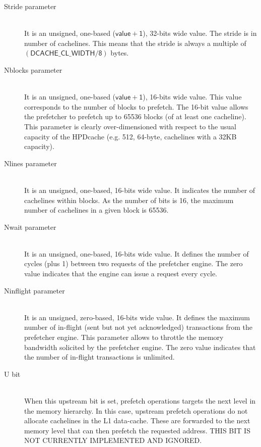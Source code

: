 \documentclass[10pt,titlepage,twoside]{book}
\begin{document}
\begin{description}

\item [\textsf{Stride} parameter] \mbox{}\\
It is an unsigned, one-based ($\mathsf{value + 1}$), 32-bits wide value.
The stride is in number of cachelines.
This means that the stride is always a multiple of $\mathsf{(DCACHE\_CL\_WIDTH/8)}$ bytes.

\item [\textsf{Nblocks} parameter] \mbox{}\\
It is an unsigned, one-based ($\mathsf{value + 1}$), 16-bits wide value.
This value corresponds to the number of blocks to prefetch.
The 16-bit value allows the prefetcher to prefetch up to 65536 blocks (of at least one cacheline).
This parameter is clearly over-dimensioned with respect to the usual capacity of the \ac{HPDcache} (e.g. 512, 64-byte, cachelines with a 32KB capacity).

\item [\textsf{Nlines} parameter] \mbox{}\\
It is an unsigned, one-based, 16-bits wide value.
It indicates the number of cachelines within blocks.
As the number of bits is 16, the maximum number of cachelines in a given block is 65536.

\item [\textsf{Nwait} parameter] \mbox{}\\
It is an unsigned, one-based, 16-bits wide value.
It defines the number of cycles (plus 1) between two requests of the prefetcher engine.
The zero value indicates that the engine can issue a request every cycle.

\item [\textsf{Ninflight} parameter] \mbox{}\\
It is an unsigned, zero-based, 16-bits wide value.
It defines the maximum number of in-flight (sent but not yet acknowledged) transactions from the prefetcher engine.
This parameter allows to throttle the memory bandwidth solicited by the prefetcher engine.
The zero value indicates that the number of in-flight transactions is unlimited.

\item [\textsf{U} bit] \mbox{}\\
When this upstream bit is set, prefetch operations targets the next level in the memory hierarchy.
In this case, upstream prefetch operations do not allocate cachelines in the L1 data-cache.
These are forwarded to the next memory level that can then prefetch the requested address.
THIS BIT IS NOT CURRENTLY IMPLEMENTED AND IGNORED.


\end{description}
\end{document}
